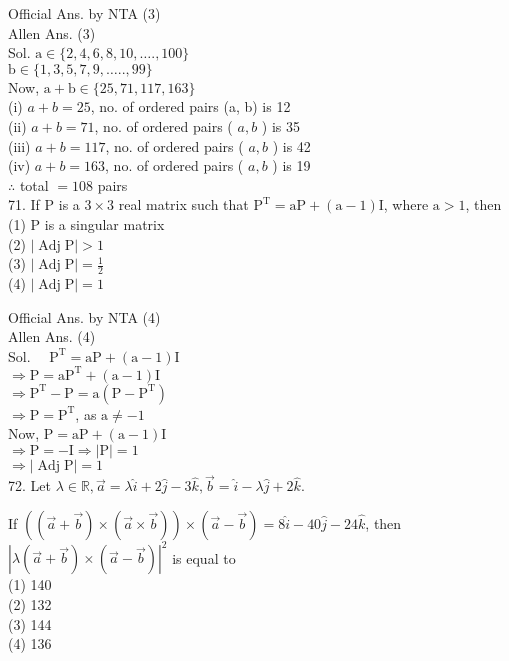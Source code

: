 \documentclass[10pt]{article}
\begin{document}
Official Ans. by NTA (3)\\
Allen Ans. (3)\\
Sol. \(\mathrm{a} \in\{2,4,6,8,10, \ldots ., 100\}\)\\
\(\mathrm{b} \in\{1,3,5,7,9, \ldots . ., 99\}\)\\
Now, \(\mathrm{a}+\mathrm{b} \in\{25,71,117,163\}\)\\
(i) \(a+b=25\), no. of ordered pairs (a, b) is 12\\
(ii) \(a+b=71\), no. of ordered pairs ( \(a, b\) ) is 35\\
(iii) \(a+b=117\), no. of ordered pairs ( \(a, b\) ) is 42\\
(iv) \(a+b=163\), no. of ordered pairs ( \(a, b\) ) is 19\\
\(\therefore\) total \(=108\) pairs\\
71. If P is a \(3 \times 3\) real matrix such that \(\mathrm{P}^{\mathrm{T}}=\mathrm{aP}+(\mathrm{a}-1) \mathrm{I}\), where \(\mathrm{a}>1\), then\\
(1) P is a singular matrix\\
(2) \(|\operatorname{Adj} \mathrm{P}|>1\)\\
(3) \(|\operatorname{Adj} \mathrm{P}|=\frac{1}{2}\)\\
(4) \(|\operatorname{Adj} \mathrm{P}|=1\)

Official Ans. by NTA (4)\\
Allen Ans. (4)\\
Sol. \(\quad \mathrm{P}^{\mathrm{T}}=\mathrm{aP}+(\mathrm{a}-1) \mathrm{I}\)\\
\(\Rightarrow \mathrm{P}=\mathrm{aP}^{\mathrm{T}}+(\mathrm{a}-1) \mathrm{I}\)\\
\(\Rightarrow \mathrm{P}^{\mathrm{T}}-\mathrm{P}=\mathrm{a}\left(\mathrm{P}-\mathrm{P}^{\mathrm{T}}\right)\)\\
\(\Rightarrow \mathrm{P}=\mathrm{P}^{\mathrm{T}}\), as \(\mathrm{a} \neq-1\)\\
Now, \(\mathrm{P}=\mathrm{aP}+(\mathrm{a}-1) \mathrm{I}\)\\
\(\Rightarrow \mathrm{P}=-\mathrm{I} \Rightarrow|\mathrm{P}|=1\)\\
\(\Rightarrow|\operatorname{Adj} \mathrm{P}|=1\)\\
72. Let \(\lambda \in \mathbb{R}, \vec{a}=\lambda \hat{i}+2 \hat{j}-3 \hat{k}, \vec{b}=\hat{i}-\lambda \hat{j}+2 \hat{k}\).

If \(((\vec{a}+\vec{b}) \times(\vec{a} \times \vec{b})) \times(\vec{a}-\vec{b})=8 \hat{i}-40 \hat{j}-24 \hat{k}\), then \(|\lambda(\vec{a}+\vec{b}) \times(\vec{a}-\vec{b})|^{2}\) is equal to\\
(1) 140\\
(2) 132\\
(3) 144\\
(4) 136
\end{document}
